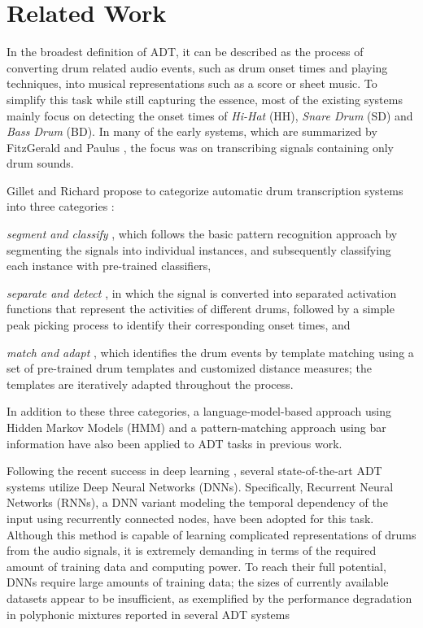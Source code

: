 \documentclass{article}
\begin{document}
\section{Related Work}\label{sec:related works}
In the broadest definition of ADT, it can be described as the process of converting drum related audio events, such as drum onset times and playing techniques, into musical representations such as a score or sheet music. To simplify this task while still capturing the essence, most of the existing systems mainly focus on detecting the onset times of \textit{Hi-Hat} (HH), \textit{Snare Drum} (SD) and \textit{Bass Drum} (BD). In many of the early systems, which are summarized by FitzGerald and Paulus \cite{FitzGerald2006}, the focus was on transcribing signals containing only drum sounds. %

Gillet and Richard propose to categorize automatic drum transcription systems into three categories \cite{Gillet2008}: 
\begin{inparaenum}[(i)]
	\item   \textit{segment and classify} \cite{Gillet2008, Gajhede2016}, which follows the basic pattern recognition approach by segmenting the signals into individual instances, and subsequently classifying each instance with pre-trained classifiers, 
    \item   \textit{separate and detect} \cite{Dittmar2014, Wu2015a, Roebel2015}, in which the signal is converted into separated activation functions that represent the activities of different drums, followed by a simple peak picking process to identify their corresponding onset times, and
    \item   \textit{match and adapt} \cite{Yoshii2007b}, which identifies the drum events by template matching using a set of pre-trained drum templates and customized distance measures; the templates are iteratively adapted throughout the process. 
\end{inparaenum} 
In addition to these three categories, a language-model-based approach using Hidden Markov Models (HMM) \cite{Paulus2009a} and a pattern-matching approach using bar information \cite{Thompson2014} have also been applied to ADT tasks in previous work. 

Following the recent success in deep learning \cite{Hinton2006}, several state-of-the-art ADT systems utilize Deep Neural Networks (DNNs). Specifically, Recurrent Neural Networks (RNNs), a DNN variant modeling the temporal dependency of the input using recurrently connected nodes, have been adopted for this task\cite{Vogl2016, Southall2016, Vogl2017}. Although this method is capable of learning complicated representations of drums from the audio signals, it is extremely demanding in terms of the required amount of training data and computing power. To reach their full potential, DNNs require large amounts of training data; the sizes of currently available datasets appear to be insufficient, as exemplified by the performance degradation in polyphonic mixtures reported in several ADT systems\cite{Wu2015a, Southall2016, Vogl2017}
\end{document}
